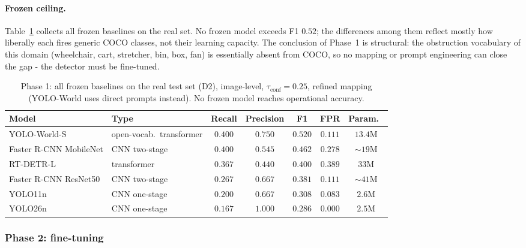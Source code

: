 \paragraph{Frozen ceiling.} Table~\ref{tab:p1-frozen} collects all frozen
baselines on the real set. No frozen model exceeds F1 $0.52$; the differences
among them reflect mostly how liberally each fires generic COCO classes, not
their learning capacity. The conclusion of Phase~1 is structural: the
obstruction vocabulary of this domain (wheelchair, cart, stretcher, bin, box,
fan) is essentially absent from COCO, so no mapping or prompt engineering can
close the gap - the detector must be fine-tuned.

\begin{table}[h]
  \centering
  \begin{tabular}{llccccc}
    \hline
    Model & Type & Recall & Precision & F1 & FPR & Param.\ \\
    \hline
    YOLO-World-S & open-vocab.\ transformer & $0.400$ & $0.750$ & $\mathbf{0.520}$ & $0.111$ & $13.4$M \\
    Faster R-CNN MobileNet & CNN two-stage & $0.400$ & $0.545$ & $0.462$ & $0.278$ & $\sim$$19$M \\
    RT-DETR-L & transformer & $0.367$ & $0.440$ & $0.400$ & $0.389$ & $33$M \\
    Faster R-CNN ResNet50 & CNN two-stage & $0.267$ & $0.667$ & $0.381$ & $0.111$ & $\sim$$41$M \\
    YOLO11n & CNN one-stage & $0.200$ & $0.667$ & $0.308$ & $0.083$ & $2.6$M \\
    YOLO26n & CNN one-stage & $0.167$ & $1.000$ & $0.286$ & $0.000$ & $2.5$M \\
    \hline
  \end{tabular}
  \caption{Phase 1: all frozen baselines on the real test set (D2), image-level,
  $\tau_{\mathrm{conf}} = 0.25$, refined mapping (YOLO-World uses direct prompts
  instead). No frozen model reaches operational accuracy.}
  \label{tab:p1-frozen}
\end{table}

\subsubsection{Phase 2: fine-tuning}

